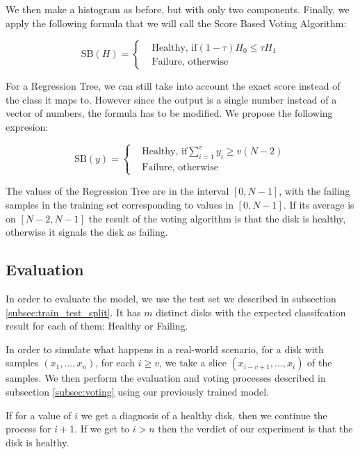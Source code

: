 We then make a histogram as before, but with only two components.
Finally, we apply the following formula that we will call the Score Based Voting Algorithm:

\begin{equation}\label{eq:score_based_voting}
  \text{SB}(H) = 
    \begin{cases}
        & \text{Healthy, if} (1-\tau)H_0 \leq \tau H_1 \\
        & \text{Failure, otherwise} 
  \end{cases}
\end{equation}

For a Regression Tree, we can still take into account the exact score instead of the class it maps to.
However since the output is a single number instead of a vector of numbers, the formula has to be modified.
We propose the following expresion:

\begin{equation}\label{eq:score_based_voting_regression}
  \text{SB}(y) = 
    \begin{cases}
        & \text{Healthy, if} \sum_{i=1}^v y_i \geq v(N-2) \\
        & \text{Failure, otherwise} 
  \end{cases}
\end{equation}

The values of the Regression Tree are in the interval $[0,N-1]$, with the failing samples in the training set corresponding to values in $[0,N-1]$.
If its average is on $[N-2,N-1]$ the result of the voting algorithm is that the disk is healthy, otherwise it signals the disk as failing.

\subsection{Evaluation}

In order to evaluate the model, we use the test set we described in subsection \ref{subsec:train_test_split}.
It has $m$ distinct disks with the expected classifcation result for each of them: Healthy or Failing.

In order to simulate what happens in a real-world scenario, for a disk with samples $(x_1,\dots,x_n)$, for each $i \geq v$, we take a slice $(x_{i-v+1}, \dots, x_i)$ of the samples.
We then perform the evaluation and voting processes described in subsection \ref{subsec:voting} using our previously trained model.

If for a value of $i$ we get a diagnosis of a healthy disk, then we continue the process for $i+1$.
If we get to $i > n$ then the verdict of our experiment is that the disk is healthy.

